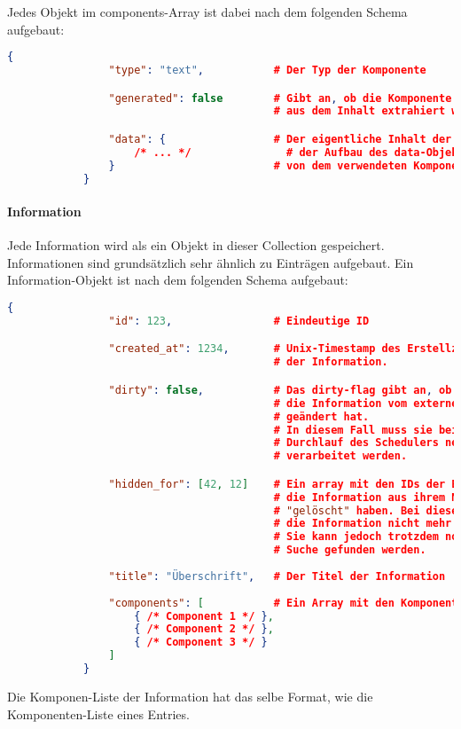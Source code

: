 		Jedes Objekt im components-Array ist dabei nach dem folgenden Schema aufgebaut:

		\begin{lstlisting}[language=JSON]
			{
				"type": "text",           # Der Typ der Komponente

				"generated": false        # Gibt an, ob die Komponente von Norbert
				                          # aus dem Inhalt extrahiert wurde.

				"data": {                 # Der eigentliche Inhalt der Komponente.
					/* ... */               # der Aufbau des data-Objekts ist abhängig
				}                         # von dem verwendeten Komponenten-Typ.
			}
		\end{lstlisting}
	\paragraph{Information} %
	\label{par:informations}
		
		Jede Information wird als ein Objekt in dieser Collection gespeichert. Informationen sind grundsätzlich sehr ähnlich zu Einträgen aufgebaut. Ein Information-Objekt ist nach dem folgenden Schema aufgebaut:

		\begin{lstlisting}[language=JSON]
			{
				"id": 123,                # Eindeutige ID

				"created_at": 1234,       # Unix-Timestamp des Erstellzeitpunktes
				                          # der Information.

				"dirty": false,           # Das dirty-flag gibt an, ob sich
				                          # die Information vom externen Service
				                          # geändert hat.
				                          # In diesem Fall muss sie beim nächsten
				                          # Durchlauf des Schedulers neu
				                          # verarbeitet werden.

				"hidden_for": [42, 12]    # Ein array mit den IDs der Benutzer, die
				                          # die Information aus ihrem Newsfeed
				                          # "gelöscht" haben. Bei diesen wird 
				                          # die Information nicht mehr angezeigt.
				                          # Sie kann jedoch trotzdem noch über die
				                          # Suche gefunden werden.
				
				"title": "Überschrift",   # Der Titel der Information
				
				"components": [           # Ein Array mit den Komponenten der Information
					{ /* Component 1 */ },
					{ /* Component 2 */ },
					{ /* Component 3 */ }
				]
			}
		\end{lstlisting}

		Die Komponen-Liste der Information hat das selbe Format, wie die Komponenten-Liste eines Entries.

